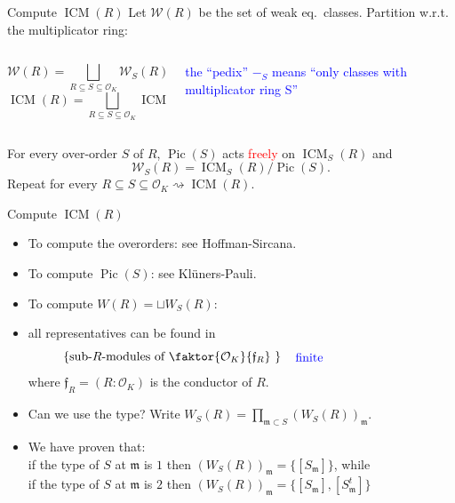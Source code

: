 \documentclass[usenames,dvipsnames]{beamer}
\DeclareMathOperator{\ICM}{ICM}
\DeclareMathOperator{\Pic}{Pic}
\newcommand{\cO}{{\mathcal O}}
\newcommand{\cW}{{\mathcal W}}
\renewcommand{\frm}{{\mathfrak m}}
\newcommand{\frf}{{\mathfrak f}}
\newcommand{\set}[1]{\left\lbrace#1\right\rbrace }
\newcommand{\red}[1]{\textcolor{red}{#1}}
\begin{document}
\begin{frame}{ Compute $\ICM(R)$ }
    Let $\cW(R)$ be the set of weak eq.~classes. 
\pause 
    Partition w.r.t. the multiplicator ring:
    \begin{columns}
    \begin{column}{0.5\textwidth}
      \[ \cW(R) = \bigsqcup_{R\subseteq S \subseteq \cO_K} \cW_S(R)\]
      \[ \ICM(R) = \bigsqcup_{R\subseteq S \subseteq \cO_K} \ICM_S(R)\]
    \end{column}
\pause
    \begin{column}{0.5\textwidth}  %
    \begin{center}
    \textcolor{blue}{\parbox{10em}{the ``pedix'' $-_S$ means ``only classes with multiplicator ring S''}} 
    \end{center}
    \end{column}
    \end{columns}
\pause
    \begin{theorem}[M.] 
    For every over-order $S$ of $R$, $\Pic(S)$ acts \red{freely} on $\ICM_S(R)$ and
    \[ \cW_S(R) = \ICM_S(R) / \Pic(S). \]
\pause
    Repeat for every $R\subseteq S \subseteq \cO_K \rightsquigarrow \ICM(R)$.
    \end{theorem}
\end{frame}

\begin{frame}{ Compute $\ICM(R)$ }
    \begin{itemize}
    \item To compute the overorders: see Hoffman-Sircana.
\pause
    \item To compute $\Pic(S)$: see Klüners-Pauli.
\pause
    \item To compute $W(R) = \sqcup W_S(R)$:
\pause
    \item all representatives can be found in
        \[\set{\text{sub-$R$-modules of $\faktor{\cO_K}{\frf_R}$ }} \quad \textcolor{blue}{\parbox{10 em}{finite}}\]
        where $\frf_R=(R:\cO_K)$ is the conductor of $R$.
\pause
    \item Can we use the type? Write $W_S(R) = \prod_{\frm \subset S} (W_S(R))_\frm$.
\pause
    \item We have proven that:\\
        if the type of $S$ at $\frm$ is $1$ then $(W_S(R))_\frm = \{ [S_\frm] \}$, while \\
        if the type of $S$ at $\frm$ is $2$ then $(W_S(R))_\frm = \{ [S_\frm], [S^t_\frm] \}$
    \end{itemize}
\end{frame}
\end{document}
